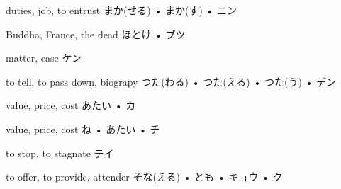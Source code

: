 



\setcounter{cardnum}{9}

		{duties, job, to entrust}
		{まか(せる) • まか(す) • ニン}
		{}{}
		{}{}
		{}{}
		{}{}
		{}{}

		{Buddha, France, the dead}
		{ほとけ • ブツ}
		{}{}
		{}{}
		{}{}
		{}{}
		{}{}

		{matter, case}
		{ケン}
		{}{}
		{}{}
		{}{}
		{}{}
		{}{}

		{to tell, to pass down, biograpy}
		{つた(わる) • つた(える) • つた(う) • デン}
		{}{}
		{}{}
		{}{}
		{}{}
		{}{}

		{value, price, cost}
		{あたい • カ}
		{}{}
		{}{}
		{}{}
		{}{}
		{}{}

		{value, price, cost}
		{ね • あたい • チ}
		{}{}
		{}{}
		{}{}
		{}{}
		{}{}

		{to stop, to stagnate}
		{テイ}
		{}{}
		{}{}
		{}{}
		{}{}
		{}{}

		{to offer, to provide, attender}
		{そな(える) • とも • キョウ • ク}
		{}{}
		{}{}
		{}{}
		{}{}
		{}{}

